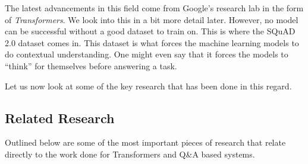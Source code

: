 \documentclass[11pt]{article}
\begin{document}
	The latest advancements in this field come from Google's research lab in the form of \textit{Transformers}. We look into this in a bit more detail later. However, no model can be successful without a good dataset to train on. This is where the SQuAD 2.0 dataset \citep{dataset} comes in. This dataset is what forces the machine learning models to do contextual understanding. One might even say that it forces the models to ``think'' for themselves before answering a task.

    Let us now look at some of the key research that has been done in this regard.

	\subsection{Related Research}\label{rr}
	Outlined below are some of the most important pieces of research that relate directly to the work done for Transformers and Q\&A based systems.
\end{document}
